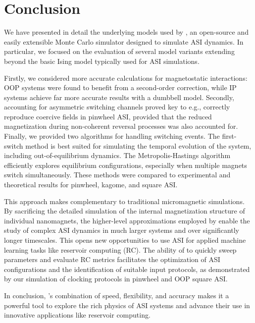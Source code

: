 \section{Conclusion}
We have presented in detail the underlying models used by \hotspice{}, an open-source and easily extensible Monte Carlo simulator designed to simulate ASI dynamics.
In particular, we focused on the evaluation of several model variants extending beyond the basic Ising model typically used for ASI simulations. \par
Firstly, we considered more accurate calculations for magnetostatic interactions: OOP systems were found to benefit from a second-order correction, while IP systems achieve far more accurate results with a dumbbell model.
Secondly, accounting for asymmetric switching channels proved key to e.g., correctly reproduce coercive fields in pinwheel ASI, provided that the reduced magnetization during non-coherent reversal processes was also accounted for.
Finally, we provided two algorithms for handling switching events.
The first-switch method is best suited for simulating the temporal evolution of the system, including out-of-equilibrium dynamics.
The Metropolis-Hastings algorithm efficiently explores equilibrium configurations, especially when multiple magnets switch simultaneously.
These methods were compared to experimental and theoretical results for pinwheel, kagome, and square ASI. \par
This approach makes \hotspice{} complementary to traditional micromagnetic simulations.
By sacrificing the detailed simulation of the internal magnetization structure of individual nanomagnets, the higher-level approximations employed by \hotspice{} enable the study of complex ASI dynamics in much larger systems and over significantly longer timescales.
This opens new opportunities to use ASI for applied machine learning tasks like reservoir computing (RC).
The ability of \hotspice{} to quickly sweep parameters and evaluate RC metrics facilitates the optimization of ASI configurations and the identification of suitable input protocols, as demonstrated by our simulation of clocking protocols in pinwheel and OOP square ASI. \par
In conclusion, \hotspice{}'s combination of speed, flexibility, and accuracy makes it a powerful tool to explore the rich physics of ASI systems and advance their use in innovative applications like reservoir computing.
